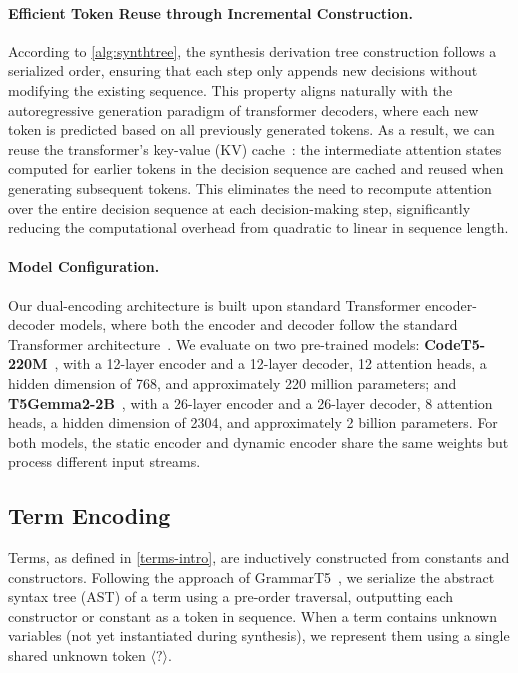 \paragraph{Efficient Token Reuse through Incremental Construction.}
According to \autoref{alg:synthtree}, the synthesis derivation tree construction follows a serialized order, ensuring that each step only appends new decisions without modifying the existing sequence.
This property aligns naturally with the autoregressive generation paradigm of transformer decoders, where each new token is predicted based on all previously generated tokens.
%
As a result, we can reuse the transformer's key-value (KV) cache~\cite{DBLP:conf/mlsys/PopeDCDBHXAD23}: the intermediate attention states computed for earlier tokens in the decision sequence are cached and reused when generating subsequent tokens. This eliminates the need to recompute attention over the entire decision sequence at each decision-making step, significantly reducing the computational overhead from quadratic to linear in sequence length.

\paragraph{Model Configuration.}
Our dual-encoding architecture is built upon standard Transformer encoder-decoder models, where both the encoder and decoder follow the standard Transformer architecture~\cite{DBLP:conf/nips/VaswaniSPUJGKP17}. We evaluate on two pre-trained models: \textbf{CodeT5-220M}~\cite{DBLP:conf/emnlp/0034WJH21}, with a 12-layer encoder and a 12-layer decoder, 12 attention heads, a hidden dimension of 768, and approximately 220 million parameters; and \textbf{T5Gemma2-2B}~\cite{zhang2025t5gemma2seeingreading}, with a 26-layer encoder and a 26-layer decoder, 8 attention heads, a hidden dimension of 2304, and approximately 2 billion parameters. For both models, the static encoder and dynamic encoder share the same weights but process different input streams.

\subsection{Term Encoding}
\label{sec:term-encoding}
Terms, as defined in \autoref{terms-intro}, are inductively constructed from constants and constructors. Following the approach of GrammarT5~\cite{DBLP:conf/icse/ZhuL000C24}, we serialize the abstract syntax tree (AST) of a term using a pre-order traversal, outputting each constructor or constant as a token in sequence. When a term contains unknown variables (not yet instantiated during synthesis), we represent them using a single shared unknown token $\langle?\rangle$.

